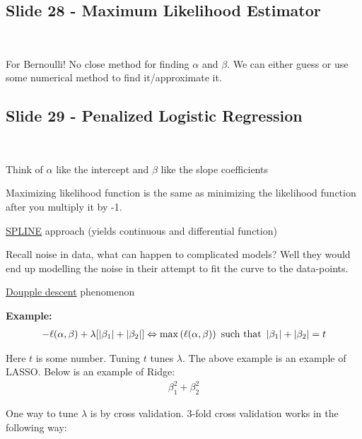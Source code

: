 \subsection{Slide 28 - Maximum Likelihood Estimator}\hfill\\\par
\noindent For Bernoulli! No close method for finding $\alpha$ and $\beta$. We can either guess or use some numerical method to find it/approximate it.
\par\bigskip
\subsection{Slide 29 - Penalized Logistic Regression}\hfill\\\par
\noindent Think of $\alpha$ like the intercept and $\beta$ like the slope coefficients \par
\noindent Maximizing likelihood function is the same as minimizing the likelihood function after you multiply it by -1.
\par\bigskip
\noindent\underline{SPLINE} approach (yields continuous and differential function)\par
\noindent Recall noise in data, what can happen to complicated models? Well they would end up modelling the noise in their attempt to fit the curve to the data-points.
\par\bigskip
\noindent\underline{Doupple descent} phenomenon
\par\bigskip
\noindent\textbf{Example:}
\begin{equation*}
  \begin{gathered}
    -\ell(\alpha,\beta)+\lambda[\left|\beta_1\right|+\left|\beta_2\right|]\Leftrightarrow \max\left(\ell(\alpha,\beta)\right) \text{ such that } \left|\beta_1\right|+\left|\beta_2\right| = t
  \end{gathered}
\end{equation*}\par
\noindent Here $t$ is some number. Tuning $t$ tunes $\lambda$. The above example is an example of LASSO. Below is an example of Ridge:
\begin{equation*}
  \begin{gathered}
    \beta_1^2+\beta_2^2
  \end{gathered}
\end{equation*}\par
\noindent One way to tune $\lambda$ is by cross validation. 3-fold cross validation works in the following way:\par
